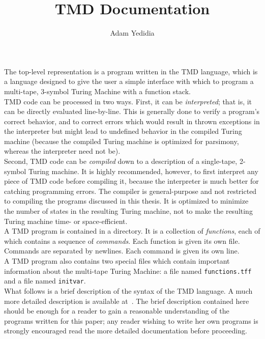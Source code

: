 \documentclass[11pt]{article}
\title{TMD Documentation}
\author{Adam Yedidia}
\begin{document}
    
\maketitle

The top-level representation is a program written in the TMD language, which is a language designed to give the user a simple interface with which to program a multi-tape, 3-symbol Turing Machine with a function stack. \\

TMD code can be processed in two ways. First, it can be \emph{interpreted}; that is, it can be directly evaluated line-by-line. This is generally done to verify a program's correct behavior, and to correct errors which would result in thrown exceptions in the interpreter but might lead to undefined behavior in the compiled Turing machine (because the compiled Turing machine is optimized for parsimony, whereas the interpreter need not be). \\

Second, TMD code can be \emph{compiled} down to a description of a single-tape, 2-symbol Turing machine. It is highly recommended, however, to first interpret any piece of TMD code before compiling it, because the interpreter is much better for catching programming errors. The compiler is general-purpose and not restricted to compiling the programs discussed in this thesis. It is optimized to minimize the number of states in the resulting Turing machine, not to make the resulting Turing machine time- or space-efficient. \\

A TMD program is contained in a directory. It is a collection of \emph{functions}, each of which contains a sequence of \emph{commands}. Each function is given its own file. Commands are separated by newlines. Each command is given its own line. \\

A TMD program also contains two special files which contain important information about the multi-tape Turing Machine: a file named {\tt functions.tff} and a file named {\tt initvar}. \\ 

What follows is a brief description of the syntax of the TMD language. A much more detailed description is available at~\cite{github}. The brief description contained here should be enough for a reader to gain a reasonable understanding of the programs written for this paper; any reader wishing to write her own programs is strongly encouraged read the more detailed documentation before proceeding.
\end{document}

